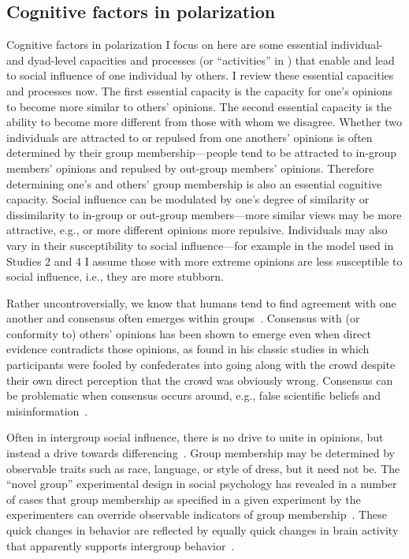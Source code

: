 \documentclass[12pt,letterpaper]{article}
\begin{document}
\subsection{Cognitive factors in polarization}

Cognitive factors in polarization I focus on here are some essential
individual- and dyad-level capacities and processes (or ``activities'' in
) that
enable and lead to social influence of one individual by others. I review
these essential capacities and processes now. The first essential capacity
is the capacity for one's opinions to become more similar to others' opinions.
The second essential capacity is the ability to become more different from those
with whom we disagree. Whether two individuals are attracted to or repulsed
from one anothers' opinions is often determined by their group membership---people
tend to be attracted to in-group members' opinions and repulsed by out-group
members' opinions. Therefore determining one's and others' group membership is also an essential
cognitive capacity. Social influence can be modulated by one's degree of
similarity or dissimilarity to in-group or out-group members---more similar
views may be more attractive, e.g., or more different opinions more repulsive.
Individuals may also vary in their susceptibility to social influence---for
example in the model used in Studies 2 and 4 I assume those with more
extreme opinions are less susceptible to social influence, i.e., 
they are more stubborn.

Rather uncontroversially, we know that humans tend to find agreement with
one another and consensus often 
emerges within groups~\cite{Festinger1954,Cartwright1956,French1956}. 
Consensus with (or conformity to) others' opinions has been shown to emerge 
even when direct evidence contradicts those opinions, as 
found in his classic studies in which participants were fooled by confederates
into going along with the crowd despite their own direct perception that
the crowd was obviously wrong. Consensus can be problematic when
consensus occurs around, e.g., 
false scientific beliefs and 
misinformation~\cite{Zollman2007,Zollman2013,OConnor2018,OConnor2019e}.

Often in intergroup social influence, there is no drive to unite in
opinions, but instead a drive towards differencing~\cite{Tajfel1979,Sherif1988,Flache2011}. 
Group membership may be determined by observable traits such as race, language,
or style of dress, but it need not be. The ``novel group'' experimental design in
social psychology has revealed in a number of cases that group membership
as specified in a given experiment by the experimenters can override observable
indicators of group membership~\cite{Tajfel1971,Billig1973,Tajfel1982}.
These quick changes in behavior are reflected by equally quick changes in 
brain activity that apparently supports intergroup 
behavior~\cite{Cikara2014,Cikara2017}.
\end{document}
